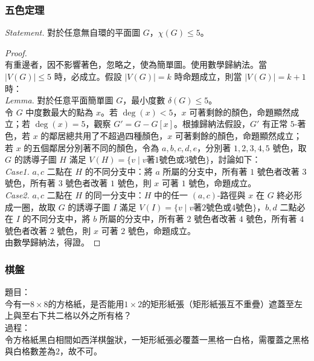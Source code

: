 \documentclass[a4paper,12pt]{report}
\begin{document}
\subsubsection{五色定理}
\textit{Statement. }對於任意無自環的平面圖 $G$，$\chi(G) \leq 5$。
\begin{proof}\mbox{}\\
有重邊者，因不影響著色，忽略之，使為簡單圖。使用數學歸納法。當 $|V(G)| \leq 5$ 時，必成立。假設 $|V(G)| = k$ 時命題成立，則當 $|V(G)| = k+1$ 時： \\
\textit{Lemma. }對於任意平面簡單圖 $G$，最小度數 $\delta(G) \leq 5$。 \\
令 $G$ 中度數最大的點為 $x$。若 $\deg(x) < 5$，$x$ 可著剩餘的顏色，命題顯然成立；若 $\deg(x) = 5$，觀察 $G' = G - G[x]$。根據歸納法假設，$G'$ 有正常 $5$-著色，若 $x$ 的鄰居總共用了不超過四種顏色，$x$ 可著剩餘的顏色，命題顯然成立；若 $x$ 的五個鄰居分別著不同的顏色，令為 $a, b, c, d, e$，分別著 $1, 2, 3, 4, 5$ 號色，取 $G$ 的誘導子圖 $H$ 滿足 $V(H) = \{v \mid v \text{著$1$號色或$3$號色}\}$，討論如下： \\
\textit{Case1.} $a, c$ 二點在 $H$ 的不同分支中：將 $a$ 所屬的分支中，所有著 $1$ 號色者改著 $3$ 號色，所有著 $3$ 號色者改著 $1$ 號色，則 $x$ 可著 $1$ 號色，命題成立。 \\
\textit{Case2.} $a, c$ 二點在 $H$ 的同一分支中：$H$ 中的任一 $(a, c)$-路徑與 $x$ 在 $G$ 終必形成一圈，故取 $G$ 的誘導子圖 $I$ 滿足 $V(I) = \{v \mid v \text{著$2$號色或$4$號色}\}$，$b, d$ 二點必在 $I$ 的不同分支中，將 $b$ 所屬的分支中，所有著 $2$ 號色者改著 $4$ 號色，所有著 $4$ 號色者改著 $2$ 號色，則 $x$ 可著 $2$ 號色，命題成立。 \\
由數學歸納法，得證。
\end{proof}
\subsubsection{棋盤}
題目：\\
今有一$8\times 8$的方格紙，是否能用$1\times 2$的矩形紙張（矩形紙張互不重疊）遮蓋至左上與至右下共二格以外之所有格？\\
過程：\\
令方格紙黑白相間如西洋棋盤狀，一矩形紙張必覆蓋一黑格一白格，需覆蓋之黑格與白格數差為$2$，故不可。
\end{document}
